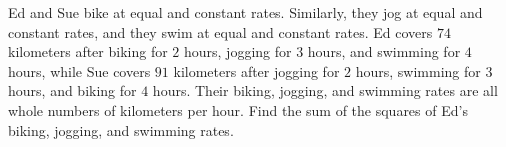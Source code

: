 Ed and Sue bike at equal and constant rates.  Similarly, they jog at equal and constant rates, and they swim at equal and constant rates.  Ed covers $ 74$ kilometers after biking for $ 2$ hours, jogging for $ 3$ hours, and swimming for $ 4$ hours, while Sue covers $ 91$ kilometers after jogging for $ 2$ hours, swimming for $ 3$ hours, and biking for $ 4$ hours.  Their biking, jogging, and swimming rates are all whole numbers of kilometers per hour.  Find the sum of the squares of Ed's biking, jogging, and swimming rates.